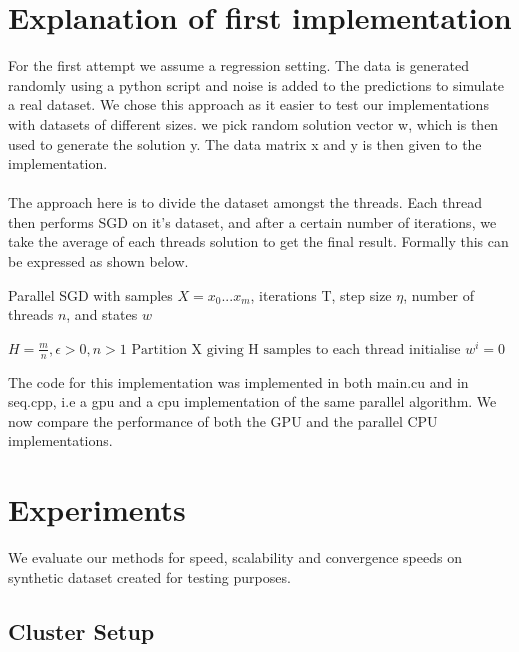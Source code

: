 \documentclass{article}
\begin{document}
\section{Explanation of first implementation}
For the first attempt we assume a regression setting. The data is generated randomly using a python script and noise is added to the predictions to simulate a real dataset. We chose this approach as it easier to test our implementations with datasets of different sizes. we pick random solution vector w, which is then used to generate the solution y. The data matrix x and y is then given to the implementation.
\\\\
The approach here is to divide the dataset amongst the threads. Each thread then performs SGD on it's dataset, and after a certain number of iterations, we take the average of each threads solution to get the final result.
Formally this can be expressed as shown below.
\begin{algorithm}
	\caption{Parallel SGD with samples $X= x_0 ... x_m$, iterations T, step size $\eta$, number of threads $n$, and states $w$ }\label{psgd}
	\begin{algorithmic}[1]
		\Require $H = \frac{m}{n}, \epsilon > 0, n > 1$
		\State $\text{Partition X giving H samples to each thread}$
		\State initialise $w^i = 0$
		\EndFor
		\EndFor
		\EndProcedure
	\end{algorithmic}
\end{algorithm}

The code for this implementation was implemented in both main.cu and in seq.cpp, i.e a gpu and a cpu implementation of the same parallel algorithm. We now compare the performance of both the GPU and the parallel CPU implementations.


\section{Experiments}

We evaluate our methods for speed, scalability and convergence speeds on synthetic dataset created for testing purposes.

\subsection{Cluster Setup}
\end{document}
